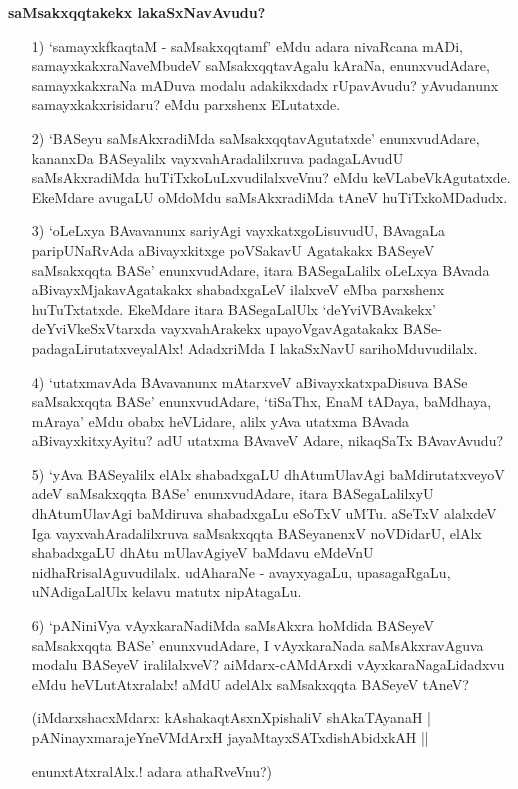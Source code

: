 \bigskip
\noindent
{\large\bf saMsakxqqtakekx lakaSxNavAvudu?}\label{page2}
\smallskip
\begin{itemize}
\item[1)] `samayxkfkaqtaM - saMsakxqqtamf' eMdu adara nivaRcana mADi, samayxkakxraNaveMbudeV saMsakxqqtavAgalu kAraNa, enunxvudAdare, samayxkakxraNa mADuva modalu adakikxdadx rUpavAvudu? yAvudanunx samayxkakxrisidaru? eMdu parxshenx ELutatxde.

\item[2)] `BASeyu saMsAkxradiMda saMsakxqqtavAgutatxde' enunxvudAdare, kananxDa BASeyalilx vayxvahAradalilxruva padagaLAvudU saMsAkxradiMda huTiTxkoLuLxvudilalxveVnu? eMdu keVLabeVkAgutatxde. EkeMdare avugaLU oMdoMdu saMsAkxradiMda tAneV huTiTxkoMDadudx.

\item[3)] `oLeLxya BAvavanunx sariyAgi vayxkatxgoLisuvudU, BAvagaLa paripUNaRvAda aBivayxkitxge poVSakavU Agatakakx BASeyeV saMsakxqqta BASe' enunxvudAdare, itara BASegaLalilx oLeLxya BAvada aBivayxMjakavAgatakakx shabadxgaLeV ilalxveV eMba parxshenx huTuTxtatxde. EkeMdare itara BASegaLalUlx `deYviVBAvakekx' deYviVkeSxVtarxda vayxvahArakekx upayoVgavAgatakakx BASe-padagaLirutatxveyalAlx! AdadxriMda I lakaSxNavU sarihoMduvudilalx.



\item[4)] `utatxmavAda BAvavanunx mAtarxveV aBivayxkatxpaDisuva BASe saMsakxqqta BASe' enunxvudAdare, `tiSaThx, EnaM tADaya, baMdhaya, mAraya' eMdu obabx heVLidare, alilx yAva utatxma BAvada aBivayxkitxyAyitu? adU utatxma BAvaveV Adare, nikaqSaTx BAvavAvudu?

\vfill\eject

\item[5)] `yAva BASeyalilx elAlx shabadxgaLU dhAtumUlavAgi baMdirutatxveyoV adeV saMsakxqqta BASe' enunxvudAdare, itara BASegaLalilxyU dhAtumUlavAgi baMdiruva shabadxgaLu eSoTxV uMTu. aSeTxV alalxdeV Iga vayxvahAradalilxruva saMsakxqqta BASeyanenxV noVDidarU, elAlx shabadxgaLU dhAtu mUlavAgiyeV baMdavu eMdeVnU nidhaRrisalAguvudilalx. udAharaNe - avayxyagaLu, upasagaRgaLu, uNAdigaLalUlx kelavu matutx nipAtagaLu.

\item[6)] `pANiniVya vAyxkaraNadiMda saMsAkxra hoMdida BASeyeV saMsakxqqta BASe' enunxvudAdare, I vAyxkaraNada saMsAkxravAguva modalu BASeyeV iralilalxveV? aiMdarx-cAMdArxdi vAyxkaraNagaLidadxvu eMdu heVLutAtxralalx! aMdU adelAlx saMsakxqqta BASeyeV tAneV?

\begin{shloka}
(iMdarxshacxMdarx: kAshakaqtAsxnXpishaliV shAkaTAyanaH |\\\label{3}
pANinayxmarajeYneVMdArxH jayaMtayxSATxdishAbidxkAH ||
\end{shloka}
enunxtAtxralAlx.! adara athaRveVnu?)
\end{itemize}

